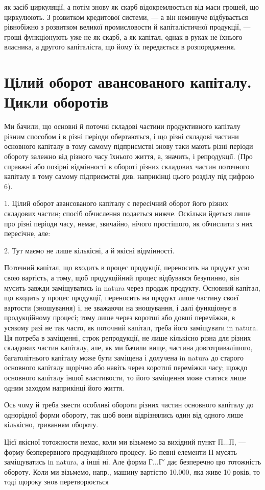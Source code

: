 \parcont{}  %
як засіб циркуляції, а потім знову як скарб відокремлюється від маси
грошей, що циркулюють. З розвитком кредитової системи, — а він неминуче
відбувається рівнобіжно з розвитком великої промисловости й капіталістичної
продукції, — гроші функціонують уже не як скарб, а як капітал,
однак в руках не їхнього власника, а другого капіталіста, що йому
їх передається в розпорядження.

\section{Цілий оборот авансованого капіталу. Цикли
оборотів}

Ми бачили, що основні й поточні складові частини продуктивного
капіталу різним способом і в різні періоди обертаються, і що різні складові
частини основного капіталу в тому самому підприємстві знову таки
мають різні періоди обороту залежно від різного часу їхнього життя, а,
значить, і репродукції. (Про справжні або позірні відмінності в обороті
різних складових частин поточного капіталу в тому самому підприємстві
див. наприкінці цього розділу під цифрою 6).

1. Цілий оборот авансованого капіталу є пересічний оборот його різних
складових частин; спосіб обчислення подається нижче. Оскільки
йдеться лише про різні періоди часу, немає, звичайно, нічого простішого,
як обчислити з них пересічне, але:

2. Тут маємо не лише кількісні, а й якісні відмінності.

Поточний капітал, що входить в процес продукції, переносить на
продукт усю свою вартість, а тому, щоб продукційний процес відбувався
безупинно, він мусить завжди заміщуватись in natura через продаж
продукту. Основний капітал, що входить у процес продукції, переносить
на продукт лише частину своєї вартости (зношування) і, не зважаючи на
зношування, і далі функціонує в продукційному процесі; тому лише через
коротші або довші переміжки, в усякому разі не так часто, як поточний
капітал, треба його заміщувати in natura. Ця потреба в заміщенні, строк
репродукції, не лише кількісно різна для різних складових частин капіталу,
але, як ми бачили вище, частина довготривалішого, багатолітнього
капіталу може бути заміщена і долучена in natura до старого основного
капіталу щорічно або навіть через коротші переміжки часу; щождо основного
капіталу іншої властивости, то його заміщення може статися лише
одним заходом наприкінці його життя.

Ось чому й треба звести особливі обороти різних частин основного
капіталу до однорідної форми обороту, так щоб вони відрізнялись один
від одного лише кількісно, триванням обороту.

Цієї якісної тотожности немає, коли ми візьмемо за вихідний пункт
$П\dots{} П$, — форму безперервного продукційного процесу. Бо певні елементи
П мусять заміщуватись in natura, а інші ні. Але форма $Г\dots{} Г'$ дає безперечно
цю тотожність обороту. Коли ми візьмемо, напр., машину вартістю
\num{10.000}, яка живе 10 років, то тоді щороку знов перетворюється
\parbreak{}  %
